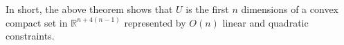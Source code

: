 In short, the above theorem shows that  $U$ is the first $n$ dimensions of a convex compact set in $\mathbb{R}^{n+4(n-1)}$ represented by $O(n)$ linear and quadratic constraints. 
